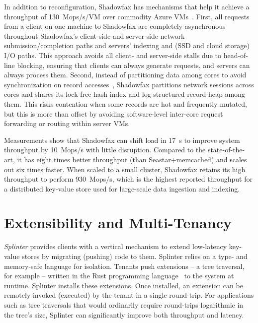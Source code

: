 In addition to reconfiguration, Shadowfax has mechanisms that help it
achieve a throughput of 130~Mops/s/VM over
commodity Azure VMs~\cite{azure}.
%
First, all requests from a client on one machine to Shadowfax are
completely asynchronous throughout Shadowfax's client-side and
server-side network submission/completion paths and servers' indexing and
(SSD and cloud storage) I/O paths.
%
This approach avoids all client- and server-side stalls due to head-of-line
blocking, ensuring that clients can always generate
requests, and
servers can always process them.
%
Second, instead of partitioning data among cores to avoid synchronization on record
accesses~\cite{hstore,voltdb,mica,seastar}, Shadowfax partitions network
sessions across cores and shares its lock-free hash index and log-structured
record heap among them.
%
This risks contention when some records are hot and frequently
mutated, but this is more than offset by avoiding software-level
inter-core request forwarding or routing within server VMs.

Measurements show that Shadowfax can shift load in 17~s to improve system throughput by
10~Mops/s
with little disruption. Compared to the state-of-the-art, it has eight
times better throughput
  (than Seastar+memcached) and scales out six times faster.
%
When scaled to a small cluster, Shadowfax retains its high throughput to
perform 930~Mops/s,
%
which is the highest
reported throughput for a distributed key-value store used for
large-scale data ingestion and indexing.

\section{Extensibility and Multi-Tenancy}

\emph{Splinter} provides clients with a vertical mechanism
to extend low-latency key-value stores by migrating (pushing) code to them.
%
Splinter relies on a type- and memory-safe language for isolation.
%
Tenants push
extensions – a tree traversal, for example – written in the Rust
programming language~\cite{rust} to the system at runtime.
%
Splinter installs
these extensions.
%
Once installed, an extension can
be remotely invoked (executed) by the tenant in a
single round-trip.
%
For applications such as tree traversals that would ordinarily require
round-trips logarithmic in the tree's size, Splinter can
significantly improve both throughput and latency.

